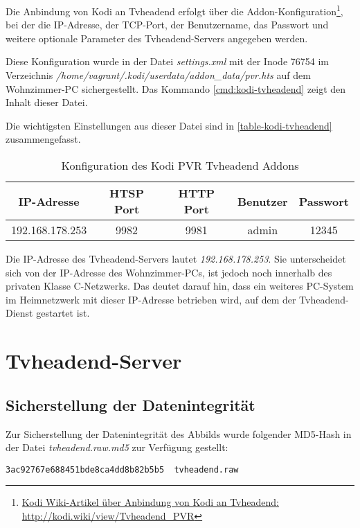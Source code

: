 Die Anbindung von Kodi an Tvheadend erfolgt über die Addon-Konfiguration\footnote{\href{http://kodi.wiki/view/Tvheadend\_PVR\#Connecting\_Kodi\_to\_Tvheadend}{Kodi Wiki-Artikel über Anbindung von Kodi an Tvheadend: http://kodi.wiki/view/Tvheadend\_PVR}}, bei der die IP-Adresse, der TCP-Port, der Benutzername, das Passwort und weitere optionale Parameter des Tvheadend-Servers angegeben werden.

Diese Konfiguration wurde in der Datei \textit{settings.xml} mit der Inode 76754 im Verzeichnis \textit{/home/vagrant/.kodi/userdata/addon\_data/pvr.hts} auf dem Wohnzimmer-PC sichergestellt. Das Kommando \autoref{cmd:kodi-tvheadend} zeigt den Inhalt dieser Datei.

Die wichtigsten Einstellungen aus dieser Datei sind in \autoref{table-kodi-tvheadend} zusammengefasst.

\begin{table}[H]
\centering
\begin{tabular}{ccccc}
\toprule
IP-Adresse & HTSP Port & HTTP Port & Benutzer & Passwort \\ 
\midrule
192.168.178.253 & 9982 & 9981 & admin & 12345 \\ 
\bottomrule
\end{tabular}
\caption{Konfiguration des Kodi PVR Tvheadend Addons}
\label{table-kodi-tvheadend}
\end{table}

Die IP-Adresse des Tvheadend-Servers lautet \textit{192.168.178.253}. Sie unterscheidet sich von der IP-Adresse des Wohnzimmer-PCs, ist jedoch noch innerhalb des privaten Klasse C-Netzwerks. Das deutet darauf hin, dass ein weiteres PC-System im Heimnetzwerk mit dieser IP-Adresse betrieben wird, auf dem der Tvheadend-Dienst gestartet ist.

\section{Tvheadend-Server}

\subsection{Sicherstellung der Datenintegrität}

Zur Sicherstellung der Datenintegrität des Abbilds wurde folgender MD5-Hash in der Datei \textit{tvheadend.raw.md5} zur Verfügung gestellt:

\begin{verbatim}
3ac92767e688451bde8ca4dd8b82b5b5  tvheadend.raw
\end{verbatim}

